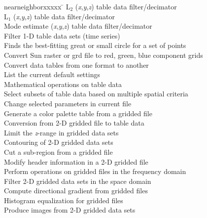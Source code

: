 \begin{tabbing}
nearneighborxxxxx \=					\kill
{}	\>	L$_2$ ({\it x},{\it y},{\it z}) table data filter/decimator \\ 
	\>	L$_1$ ({\it x},{\it y},{\it z}) table data filter/decimator \\ 
	\>	Mode estimate ({\it x},{\it y},{\it z}) table data filter/decimator \\ 
	\>	Filter 1-D table data sets (time series) \\ 
	\>	Finds the best-fitting great or small circle for a set of points \\ 
	\>	Convert Sun raster or grd file to red, green, blue component grids \\ 
	\>	Convert data tables from one format to another \\ 
	\>	List the current default settings \\ 
	\>	Mathematical operations on table data \\ 
	\>	Select subsets of table data based on multiple spatial criteria \\ 
	\>	Change selected parameters in current  file \\ 
	\>	Generate a color palette table from a gridded file \\ 
	\>	Conversion from 2-D gridded file to table data \\ 
	\>	Limit the {\it z}-range in gridded data sets \\ 
	\>	Contouring of 2-D gridded data sets \\ 
	\>	Cut a sub-region from a gridded file \\ 
	\>	Modify header information in a 2-D gridded file \\ 
	\>	Perform operations on gridded files in the frequency domain \\ 
	\>	Filter 2-D gridded data sets in the space domain \\ 
	\>	Compute directional gradient from gridded files \\ 
	\>	Histogram equalization for gridded files \\ 
	\>	Produce images from 2-D gridded data sets \\ 

\end{tabbing}
